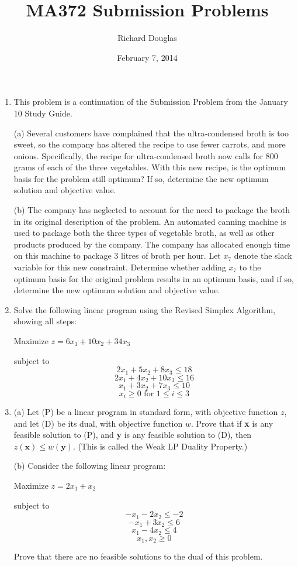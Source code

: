 \documentclass{article}[12pt,a4paper]
\title{MA372 Submission Problems}
\author{Richard Douglas}
\date{February 7,  2014} %
\begin{document}
  \maketitle
  \begin{enumerate}
	\item This problem is a continuation of the Submission Problem from the January 10 Study Guide.
	
	(a) Several customers have complained that the ultra-condensed broth is too sweet, so
	the company has altered the recipe to use fewer carrots, and more onions. Specifically, 
	the recipe for ultra-condensed broth now calls for 800 grams of each of the
	three vegetables. With this new recipe, is the optimum basis for the problem still
	optimum? If so, determine the new optimum solution and objective value.
	
	(b) The company has neglected to account for the need to package the broth in its
	original description of the problem. An automated canning machine is used to
	package both the three types of vegetable broth, as well as other products produced
	by the company. The company has allocated enough time on this machine to package
	3 litres of broth per hour. Let $x_7$ denote the slack variable for this new constraint.
	Determine whether adding $x_7$ to the optimum basis for the original problem results
	in an optimum basis, and if so, determine the new optimum solution and objective
	value.
	
	\item Solve the following linear program using the Revised Simplex Algorithm, showing all steps:
	
	\begin{center} Maximize $z = 6x_1 + 10x_2 + 34x_3$ \end{center}
	subject to 
	$$2x_1 + 5x_2 + 8x_3 \le 18$$
	$$2x_1 + 4x_2 + 10x_3 \le 16$$
	$$x_1 + 3x_2 + 7x_3 \le 10$$
	$$x_i \ge 0 \mbox{ for } 1 \le i \le 3$$
	
	\item 
	(a) Let (P) be a linear program in standard form, with objective function $z$, and let
	(D) be its dual, with objective function $w$. Prove that if \textbf{x} is any feasible solution
	to (P), and \textbf{y} is any feasible solution to (D), then $z(\mathbf{x}) \le w(\mathbf{y})$. (This is called the
	Weak LP Duality Property.)
	
	(b) Consider the following linear program:
	
	\begin{center}Maximize $z = 2x_1 + x_2$\end{center}
	subject to
	$$-x_1 - 2x_2 \le −2$$
	$$-x_1 + 3x_2 \le 6$$
	$$x_1 - 4x_2 \le 4$$
	$$x_1 ,x_2 \ge 0$$
	
	Prove that there are no feasible solutions to the dual of this problem.
  \end{enumerate}
\end{document}
